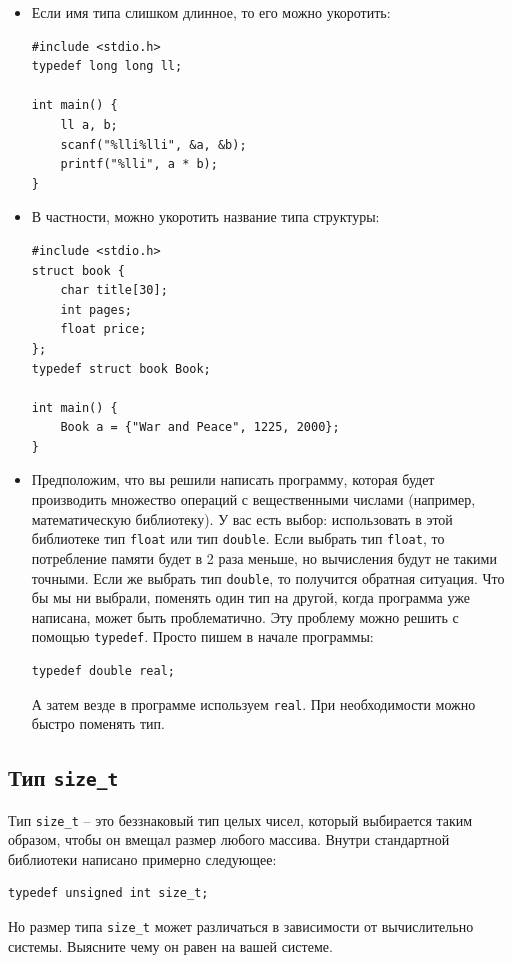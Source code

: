 \documentclass{article}
\begin{document}
\begin{itemize}
\item Если имя типа слишком длинное, то его можно укоротить:
\begin{lstlisting}
#include <stdio.h>
typedef long long ll;

int main() {
    ll a, b;
    scanf("%lli%lli", &a, &b);
    printf("%lli", a * b);
}
\end{lstlisting}

\item В частности, можно укоротить название типа структуры:
\begin{lstlisting}
#include <stdio.h>
struct book {
    char title[30];
    int pages;
    float price;
};
typedef struct book Book;

int main() {
    Book a = {"War and Peace", 1225, 2000};
}
\end{lstlisting}

\item Предположим, что вы решили написать программу, которая будет производить множество операций с вещественными числами (например, математическую библиотеку). У вас есть выбор: использовать в этой библиотеке тип \texttt{float} или тип \texttt{double}. Если выбрать тип \texttt{float}, то потребление памяти будет в 2 раза меньше, но вычисления будут не такими точными. Если же выбрать тип \texttt{double}, то получится обратная ситуация. Что бы мы ни выбрали, поменять один тип на другой, когда программа уже написана, может быть проблематично. Эту проблему можно решить с помощью \texttt{typedef}. Просто пишем в начале программы:
\begin{lstlisting}
typedef double real;
\end{lstlisting}
А затем везде в программе используем \texttt{real}. При необходимости можно быстро поменять тип.
\end{itemize}

\subsection*{Тип \texttt{size\_t}} 
Тип \texttt{size\_t} -- это беззнаковый тип целых чисел, который выбирается таким образом, чтобы он вмещал размер любого массива. Внутри стандартной библиотеки написано примерно следующее:
\begin{lstlisting}
typedef unsigned int size_t;
\end{lstlisting}
Но размер типа \texttt{size\_t} может различаться в зависимости от вычислительно системы. Выясните чему он равен на вашей системе.
\end{document}
